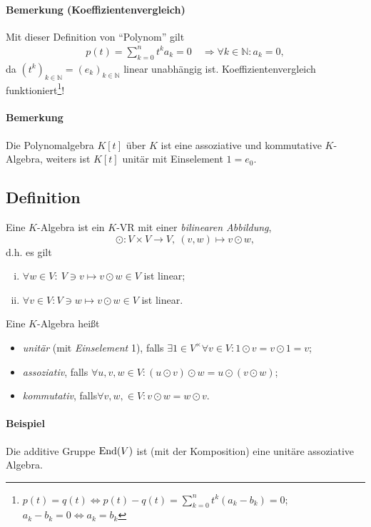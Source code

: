 \paragraph{Bemerkung (Koeffizientenvergleich)}
	Mit dieser Definition von "`Polynom"' gilt
		\begin{align*}
			p(t)=\sum_{k=0}^{n}t^ka_k = 0
			\quad\Rightarrow \forall k\in \mathbb{N}: a_k = 0,
		\end{align*}
	da $ (t^k)_{k\in \mathbb{N}} = (e_k)_{k\in \mathbb{N}}$ linear unabhängig ist.
	Koeffizientenvergleich funktioniert\footnote{$p(t)=q(t) \Leftrightarrow p(t)-q(t)=\sum_{k=0}^n t^k(a_k-b_k)=0$; $a_k-b_k=0\Leftrightarrow a_k=b_k$}!
\paragraph{Bemerkung}
	Die Polynomalgebra $ K[t] $ über $ K $ ist eine assoziative und kommutative $ K $-Algebra, weiters ist $ K[t] $ unitär mit Einselement $ 1=e_0 $.
	
\subsection{Definition}
	\begin{Definition}[Algebra]
		Eine $ K $-Algebra ist ein $ K $-VR mit einer \emph{bilinearen Abbildung},
		\[ \odot: V\times V \to V,\ (v,w)\mapsto v\odot w, \]
	d.h. es gilt
		\begin{enumerate}[(i)]
			\item $ \forall w\in V:\ V\ni v\mapsto v\odot w\in V $ ist linear;
			\item $ \forall v\in V: V\ni w\mapsto v\odot w\in V $ ist linear.
		\end{enumerate}
	Eine $ K $-Algebra heißt
		\begin{itemize}
			\item \emph{unitär} (mit \emph{Einselement} 1), falls \hfill$ \exists 1\in V^\times\forall v\in V: 1\odot v = v\odot 1 = v $;
			\item \emph{assoziativ}, falls \hfill $ \forall u,v,w\in V: (u\odot v)\odot w = u\odot (v\odot w) $;
			\item \emph{kommutativ}, falls\hfill $\forall v,w,\in V: v\odot w = w\odot v$.
		\end{itemize}
	\end{Definition}
\paragraph{Beispiel}
	Die additive Gruppe $ \operatorname{End}(V) $ ist (mit der Komposition) eine unitäre assoziative Algebra.
